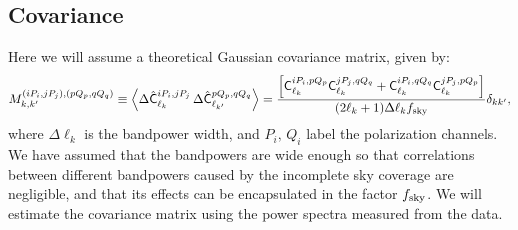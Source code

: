 \documentclass[a4paper,10pt]{article}
\begin{document}
\subsection{Covariance}
Here we will assume a theoretical Gaussian covariance matrix, given by:
\begin{equation}
 M^{(iP_i,jP_j),(pQ_p,qQ_q)}_{k,k'}\equiv\left\langle\Delta\hat{\mathsf{C}}^{iP_i,jP_j}_{\ell_k}\,\Delta\hat{\mathsf{C}}^{pQ_p,qQ_q}_{\ell_{k'}}\right\rangle=
 \frac{\left[\mathsf{C}_{\ell_k}^{iP_i,pQ_p}\mathsf{C}_{\ell_k}^{jP_j,qQ_q}+\mathsf{C}_{\ell_k}^{iP_i,qQ_q}\mathsf{C}_{\ell_k}^{jP_j,pQ_p}\right]}{(2\ell_k+1)\Delta\ell_kf_{\rm sky}}\delta_{kk'},
\end{equation}
where $\Delta{\ell_k}$ is the bandpower width, and $P_i,\,Q_i$ label the polarization channels. We have assumed that the bandpowers are wide enough so
that correlations between different bandpowers caused by the incomplete sky coverage are negligible, and that its effects can be
encapsulated in the factor $f_{\rm sky}$. We will estimate the covariance matrix using the power spectra measured from the data.
\end{document}
